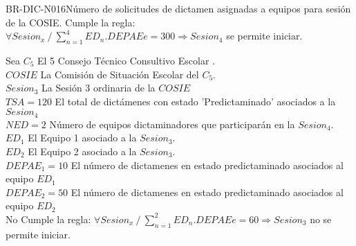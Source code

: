 \begin{BusinessRule}{BR-DIC-N016}{Número de solicitudes de dictamen asignadas a equipos para sesión de la COSIE.}
	Cumple la regla:
		$ \forall Sesion_{x}  \: /  \:  \sum_{n=1}^{4}ED_{n}.DEPAE{e}= 300 \Rightarrow Sesion_{4} $ se permite iniciar.
	

Sea $ C_{5}$ El 5 Consejo Técnico Consultivo Escolar .\\
$COSIE$ La Comisión de Situación Escolar del $ C_{5}$.\\
$Sesion_{3}$ La Sesión 3 ordinaria de la $COSIE$\\
$TSA=120$ El total de dictámenes con estado 'Predictaminado' asociados a la $Sesion_{4}$\\
$NED= 2$ Número de equipos dictaminadores que participarán en la $Sesion_{4}$.\\
$ ED_{1}$ El Equipo 1 asociado a la $Sesion_{3}$.\\
$ ED_{2}$ El Equipo 2 asociado a la $Sesion_{3}$.\\
$DEPAE_{1}= 10 $ El número de dictamenes en estado predictaminado asociados al equipo $ED_{1}$\\
$DEPAE_{2}= 50 $ El número de dictamenes en estado predictaminado asociados al equipo $ED_{2}$\\

No Cumple la regla:
$ \forall Sesion_{x}  \: /  \:  \sum_{n=1}^{2}ED_{n}.DEPAE{e}= 60 \Rightarrow Sesion_{3} $ no se permite iniciar.
\end{BusinessRule}

